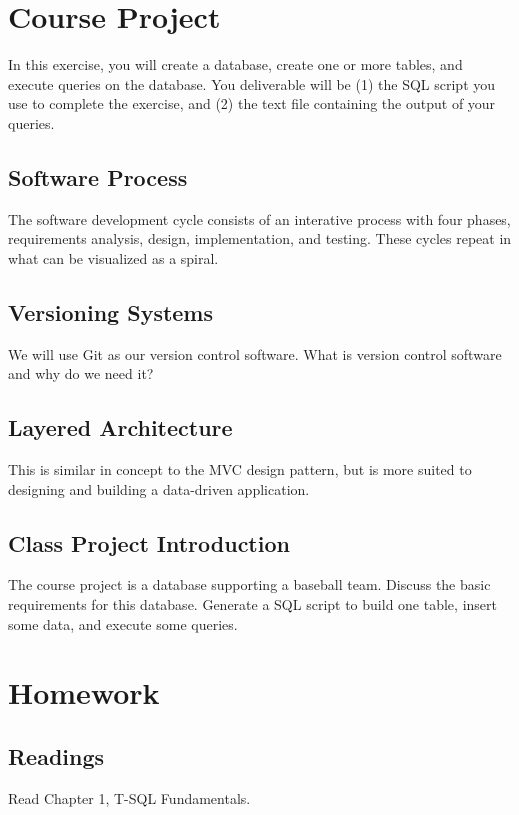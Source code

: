 \documentclass{article}
\begin{document}
    \section{Course Project}

    In this exercise, you will create a database, create one or more tables, and execute queries on the database. You deliverable will be (1) the SQL script you use to complete the exercise, and (2) the text file containing the output of your queries. 


    \subsection{Software Process}
The software development cycle consists of an interative process with four phases, requirements analysis, design, implementation, and testing. These cycles repeat in what can be visualized as a spiral.

    \subsection{Versioning Systems}
We will use Git as our version control software. What is version control software and why do we need it?

    \subsection{Layered Architecture}
    This is similar in concept to the MVC design pattern, but is more suited to designing and building a data-driven application.

    \subsection{Class Project Introduction}
    The course project is a database supporting a baseball team. Discuss the basic requirements for this database. Generate a SQL script to build one table, insert some data, and execute some queries.

    \section{Homework}

    \subsection{Readings}
    Read Chapter 1, T-SQL Fundamentals.
\end{document}

